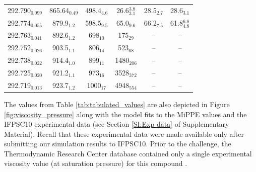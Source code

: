 \documentclass[preprint,review,12pt]{elsarticle}
\begin{document}
\begin{table}[htb!]
\begin{center}
\begin{tabular}{|c|c|c|c|c|c|}
				292.790$_{0.099}$ & 	865.64$_{0.49}$ & 	498.4$_{4.6}$ & 	26.6$^{3.8}_{3.1}$ & 	28.5$_{2.7}$ & 	28.6$_{3.1}$ \\
				292.774$_{0.055}$ & 	879.9$_{1.2}$ & 	598.5$_{9.5}$ & 	65.0$_{9.6}$ & 	66.2$_{7.5}$ & 	61.8$^{6.8}_{4.8}$ \\
				292.763$_{0.041}$ & 	892.6$_{1.2}$ & 	698$_{10}$ & 	175$_{29}$ & 	-- & 	-- \\
				292.752$_{0.026}$ & 	903.5$_{1.1}$ & 	806$_{14}$ & 	523$_{68}$ & 	-- & 	-- \\
				292.738$_{0.022}$ & 	914.4$_{1.0}$ & 	899$_{11}$ & 	1480$_{206}$ & 	-- & 	-- \\
				292.725$_{0.020}$ & 	921.2$_{1.1}$ & 	973$_{16}$ & 	3528$_{372}$ & 	-- & 	-- \\
				292.719$_{0.013}$ & 	923.7$_{1.2}$ & 	1000$_{17}$ & 	4948$_{554}$ & 	-- & 	-- \\
				\hline
			\end{tabular}
		\end{center} 
	\end{table}
	
	
	The values from Table \ref{tab:tabulated_values} are also depicted in Figure \ref{fig:viscosity_pressure} along with the model fits to the MiPPE values and the IFPSC10 experimental data (see Section \ref{SI:Exp data} of Supplementary Material). Recall that these experimental data were made available only after submitting our simulation results to IFPSC10. Prior to the challenge, the Thermodynamic Research Center database contained only a single experimental viscosity value (at saturation pressure) for this compound \cite{TDE}.
	
\end{document}
